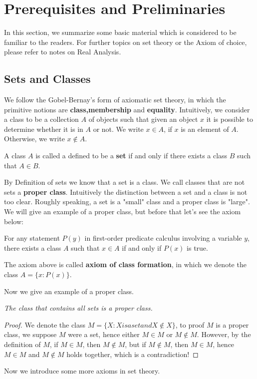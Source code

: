 \section{Prerequisites and Preliminaries}
In this section, we summarize some basic material which is considered to be familiar to the readers. For further topics on set theory or the Axiom of choice, please refer to notes on Real Analysis.
\subsection{Sets and Classes}
We follow the Gobel-Bernay's form of axiomatic set theory, in which the primitive notions are  \textbf{class,membership} and \textbf{equality}. Intuitively, we consider a class to be a collection $A$ of objects such that given an object $x$ it is possible to determine whether it is in $A$ or not. We write $x\in A$, if $x$ is an element of $A$. Otherwise, we write $x\notin A$.
\begin{definition}
A class $A$ is called a defined to be a \textbf{set} if and only if there exists a class $B$ such that $A\in B$.
\end{definition}
By Definition of sets we know that a set is a class. We call classes that are not sets a \textbf{proper class}. Intuitively the distinction between a set and a class is not too clear. Roughly speaking, a set is a "small" class and a proper class is "large". We will give an example of a proper class, but before that let's see the axiom below:
\begin{axiom}
For any statement $P(y)$ in first-order predicate calculus involving a variable $y$, there exists a class $A$ such that $x\in A$ if and only if $P(x)$ is true.
\end{axiom}
The axiom above is called \textbf{axiom of class formation}, in which we denote the class $A=\{x:P(x)\}$.\par
Now we give an example of a proper class.
\begin{example}\em
The class that contains all sets is a proper class.
\end{example}
\begin{proof}
We denote the class $M=\{X:X is a set and X\notin X\}$, to proof $M$ is a proper class, we suppose $M$ were a set, hence either $M\in M$ or $M\notin M$. However, by the definition of $M$, if $M\in M$, then $M\notin M$, but if $M\notin M$, then $M\in M$, hence $M\in M$ and $M\notin M$ holds together, which is a contradiction!
\end{proof}
Now we introduce some more axioms in set theory.
